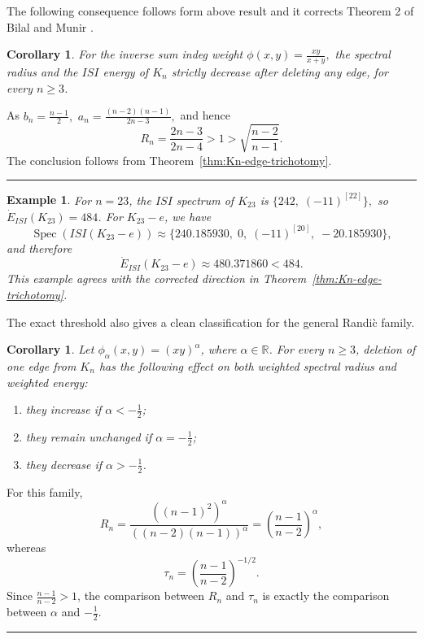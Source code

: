 \documentclass[12pt,twoside]{article}
\renewenvironment{proof}{{\noindent\bfseries Proof.}}{\qed}
\newcommand{\spec}{\operatorname{Spec}}
\newtheorem{example}[theorem]{Example}
\newtheorem{corollary}[theorem]{Corollary}
\def\qed{\nolinebreak\hfill\rule{.2cm}{.2cm}\par\addvspace{.5cm}}
\begin{document}
The following consequence follows form above result and it corrects Theorem 2  of Bilal and Munir \cite{bilalpak}.
\begin{corollary}\label{cor:ISI-Kn-deletion}
	For the inverse sum indeg weight
	$
	\phi(x,y)=\tfrac{xy}{x+y},
	$
	the spectral radius and the $ISI$ energy of $K_n$ strictly decrease after deleting any edge, for every $n\geq 3$.
\end{corollary}

\begin{proof}
	As
	$
	b_n=\tfrac{n-1}{2},
	$  $
	a_n=\tfrac{(n-2)(n-1)}{2n-3},
	$
	and hence
	$$
	R_n=\frac{2n-3}{2n-4}>1>\sqrt{\frac{n-2}{n-1}}.
	$$
	The conclusion follows from Theorem~\ref{thm:Kn-edge-trichotomy}.
\end{proof}

\begin{example}\label{ex:ISI-K23-corrected}
	For $n=23$, the $ISI$ spectrum of $K_{23}$ is
	$
	\Big\{242,\;(-11)^{[22]}\Big\},
	$
	so $\dot E_{ISI}(K_{23})=484$. For $K_{23}-e$, we have
	$$
	\spec(ISI(K_{23}-e))
	\approx
	\Big\{240.185930,\;0,\;(-11)^{[20]},\;-20.185930\Big\},
	$$
	and therefore
	$$
	\dot E_{ISI}(K_{23}-e)\approx480.371860<484.
	$$
	This example agrees with the corrected direction in Theorem~\ref{thm:Kn-edge-trichotomy}.
\end{example}

The exact threshold also gives a clean classification for the general Randi\`c family.

\begin{corollary}\label{cor:general-Randic-Kn}
	Let $\phi_\alpha(x,y)=(xy)^\alpha$, where $\alpha\in\mathbb R$. For every $n\geq3$, deletion of one edge from $K_n$ has the following effect on both weighted spectral radius and weighted energy:
	\begin{enumerate}
		\item they increase if $\alpha<-	\tfrac12$;
		\item they remain unchanged if $\alpha=-	\tfrac12$;
		\item they decrease if $\alpha>-	\tfrac12$.
	\end{enumerate}
\end{corollary}

\begin{proof}
	For this family,
	$$
	R_n
	=
	\frac{((n-1)^2)^\alpha}{((n-2)(n-1))^\alpha}
	=
	\left(\frac{n-1}{n-2}\right)^\alpha,
	$$
	whereas
	$$
	\tau_n
	=
	\left(\frac{n-1}{n-2}\right)^{-1/2}.
	$$
	Since $\tfrac{n-1}{n-2}>1$, the comparison between $R_n$ and $\tau_n$ is exactly the comparison between $\alpha$ and $-	\tfrac12$.
\end{proof}
\end{document}
